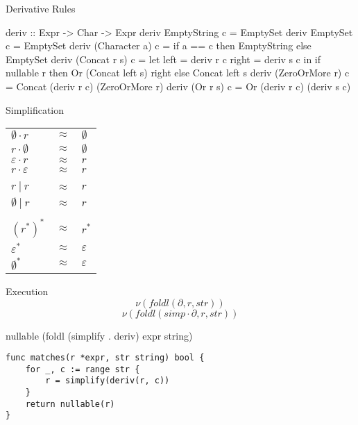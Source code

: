 \documentclass[10pt]{beamer}
\begin{document}
\begin{frame}[fragile]{Derivative Rules}
\begin{center}
\begin{haskellcode}
deriv :: Expr -> Char -> Expr
deriv EmptyString c = EmptySet
deriv EmptySet c = EmptySet
deriv (Character a) c = if a == c 
  then EmptyString else EmptySet
deriv (Concat r s) c =
  let left = deriv r c
      right = deriv s c
  in if nullable r
     then Or (Concat left s) right
     else Concat left s
deriv (ZeroOrMore r) c =
  Concat (deriv r c) (ZeroOrMore r)
deriv (Or r s) c =
  Or (deriv r c) (deriv s c)
\end{haskellcode}
\end{center}
\end{frame}

\begin{frame}[fragile]{Simplification}
\begin{center}
\begin{tabular}{lll}
$\emptyset \cdot r$ & $\approx$ & $\emptyset$ \\
$r \cdot \emptyset$ & $\approx$ & $\emptyset$ \\
$\varepsilon \cdot r$ & $\approx$ & $r$ \\
$r \cdot \varepsilon$ & $\approx$ & $r$ \\
\\
$r\ |\ r$ & $\approx$ & $r$ \\
$\emptyset\ |\ r$ & $\approx$ & $r$ \\
\\
$(r^{*})^{*}$ & $\approx$ & $r^{*}$ \\
$\varepsilon^{*}$ & $\approx$ & $\varepsilon$ \\
$\emptyset^{*}$ & $\approx$ & $\varepsilon$ \\
\end{tabular}
\end{center}
\end{frame}

\begin{frame}[fragile]{Execution}
$$
\nu(foldl(\partial, r, str))
$$
$$
\nu(foldl(simp \cdot \partial, r, str))
$$
\begin{center}
\begin{haskellcode}
nullable (foldl (simplify . deriv) expr string)
\end{haskellcode}
\end{center}
\begin{center}
\begin{verbatim}
func matches(r *expr, str string) bool {
    for _, c := range str {
        r = simplify(deriv(r, c))
    }
    return nullable(r)
}
\end{verbatim}
\end{center}
\end{frame}
\end{document}
